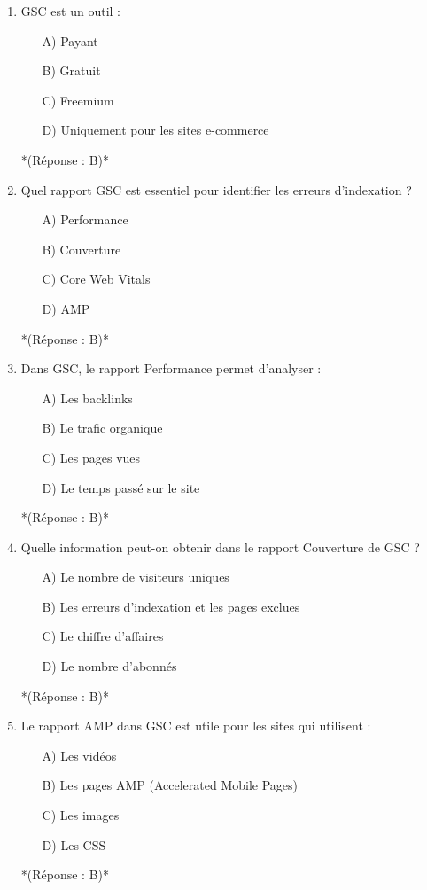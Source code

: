 \documentclass[12pt,a4paper,twoside]{report}
\begin{document}
\begin{enumerate}
    \item GSC est un outil :
    \begin{itemize}
        \item[A)] Payant
        \item[B)] Gratuit
        \item[C)] Freemium
        \item[D)] Uniquement pour les sites e-commerce
    \end{itemize}
    *(Réponse : B)*

    \item Quel rapport GSC est essentiel pour identifier les erreurs d'indexation ?
    \begin{itemize}
        \item[A)] Performance
        \item[B)] Couverture
        \item[C)] Core Web Vitals
        \item[D)] AMP
    \end{itemize}
    *(Réponse : B)*

    \item Dans GSC, le rapport Performance permet d'analyser :
    \begin{itemize}
        \item[A)] Les backlinks
        \item[B)] Le trafic organique
        \item[C)] Les pages vues
        \item[D)] Le temps passé sur le site
    \end{itemize}
    *(Réponse : B)*

    \item Quelle information peut-on obtenir dans le rapport Couverture de GSC ?
    \begin{itemize}
        \item[A)] Le nombre de visiteurs uniques
        \item[B)] Les erreurs d'indexation et les pages exclues
        \item[C)] Le chiffre d'affaires
        \item[D)] Le nombre d'abonnés
    \end{itemize}
    *(Réponse : B)*

    \item Le rapport AMP dans GSC est utile pour les sites qui utilisent :
    \begin{itemize}
        \item[A)] Les vidéos
        \item[B)] Les pages AMP (Accelerated Mobile Pages)
        \item[C)] Les images
        \item[D)] Les CSS
    \end{itemize}
    *(Réponse : B)*


\end{enumerate}
\end{document}
